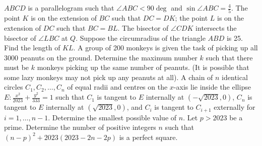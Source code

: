 \begin{enumerate}
    \hyperrefitem[Q::2023-O-1-22] $ABCD$ is a parallelogram such that $\angle ABC < 90\deg$ and $\sin \angle ABC = \frac45$. The point $K$ is on the extension of $BC$ such that $DC = DK$; the point $L$ is on the extension of $DC$ such that $BC = BL$. The bisector of $\angle CDK$ intersects the bisector of $\angle LBC$ at $Q$. Suppose the circumradius of the triangle $ABD$ is 25. Find the length of $KL$.
    \hyperrefitem[Q::2023-O-1-23] A group of 200 monkeys is given the task of picking up all 3000 peanuts on the ground. Determine the maximum number $k$ such that there must be $k$ monkeys picking up the same number of peanuts. (It is possible that some lazy monkeys may not pick up any peanuts at all).
    \hyperrefitem[Q::2023-O-1-24] A chain of $n$ identical circles $C_1, C_2, \ldots, C_n$ of equal radii and centres on the $x$-axis lie inside the ellipse $E: \frac{x^2}{2023} + \frac{y^2}{333} = 1$ such that $C_1$ is tangent to $E$ internally at $(-\sqrt{2023}, 0)$, $C_n$ is tangent to $E$ internally at $(\sqrt{2023}, 0)$, and $C_i$ is tangent to $C_{i+1}$ externally for $i = 1, \ldots , n-1$. Determine the smallest possible value of $n$.
    \hyperrefitem[Q::2023-O-1-25] Let $p > 2023$ be a prime. Determine the number of positive integers $n$ such that $(n-p)^2 + 2023(2023 - 2n - 2p)$ is a perfect square.
\end{enumerate}
